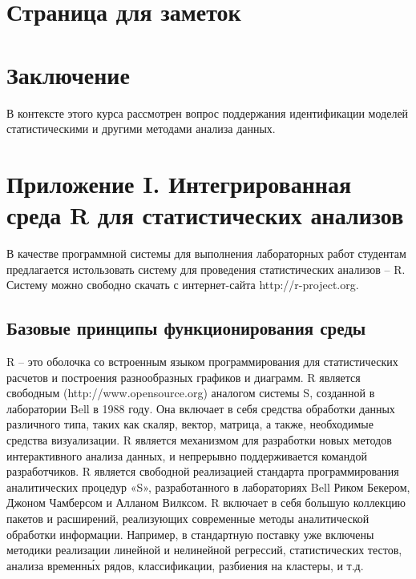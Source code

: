 \documentclass[12pt, openany, twoside]{book} %
\begin{document}
\chapter*{Страница для заметок}

\chapter*{Заключение}


В контексте этого курса рассмотрен вопрос поддержания идентификации моделей статистическими и другими методами анализа данных.


\chapter*{Приложение I. Интегрированная среда R для статистических анализов}

В качестве программной системы для выполнения лабораторных работ студентам предлагается истользовать систему для проведения статистических анализов – R. Систему можно свободно скачать с интернет-сайта http://r-project.org.

\section{Базовые принципы функционирования среды}

R – это оболочка со встроенным языком программирования для статистических расчетов и построения разнообразных графиков и диаграмм. R является свободным (http://www.opensource.org) аналогом системы S, созданной в лаборатории Bell в 1988 году. Она включает в себя средства обработки данных различного типа, таких как скаляр, вектор, матрица, а также, необходимые средства визуализации. R является механизмом для разработки новых методов интерактивного анализа данных, и непрерывно поддерживается командой разработчиков. R является свободной реализацией стандарта программирования аналитических процедур «S», разработанного в лабораториях Bell Риком Бекером, Джоном Чамберсом и Алланом Вилксом. R включает в себя большую коллекцию пакетов и расширений, реализующих современные методы аналитической обработки информации. Например, в стандартную поставку уже включены методики реализации линейной и нелинейной регрессий, статистических тестов, анализа временн\'{ы}х рядов, классификации, разбиения на кластеры, и т.д.
\end{document}
